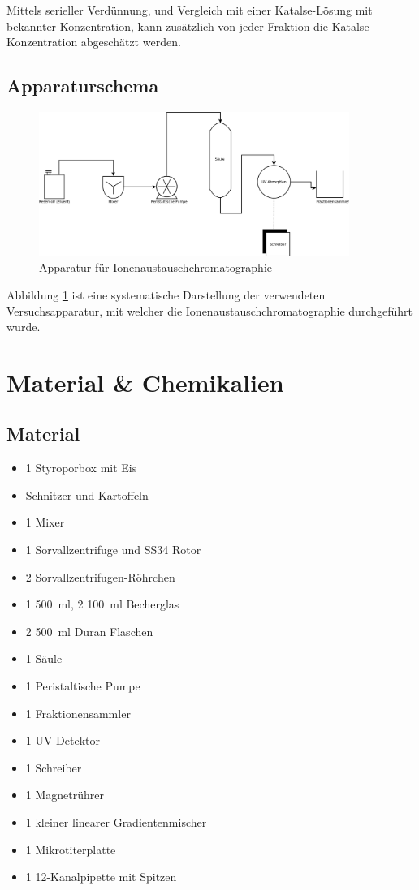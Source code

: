 \documentclass[a4paper,german]{scrreprt}
\begin{document}
Mittels serieller Verdünnung, und Vergleich mit einer Katalse-Lösung mit
bekannter Konzentration, kann zusätzlich von jeder Fraktion die
Katalse-Konzentration abgeschätzt werden.


\section{Apparaturschema}

\begin{figure}[h]
	\centering
	\includegraphics[width=0.9\textwidth]{img/apparatur.png}
	\caption{Apparatur für Ionenaustauschchromatographie}
	\label{fig:apparatur}
\end{figure}

Abbildung \ref{fig:apparatur} ist eine systematische Darstellung der
verwendeten Versuchsapparatur, mit welcher die Ionenaustauschchromatographie
durchgeführt wurde.

\chapter{Material \& Chemikalien}

\section{Material}

\begin{itemize}
	\item 1 Styroporbox mit Eis
	\item Schnitzer und Kartoffeln
	\item 1 Mixer
	\item 1 Sorvallzentrifuge und SS34 Rotor
	\item 2 Sorvallzentrifugen-Röhrchen
	\item 1 \SI{500}{ml}, 2 \SI{100}{ml} Becherglas
	\item 2 \SI{500}{ml} Duran Flaschen
	\item 1 Säule
	\item 1 Peristaltische Pumpe
	\item 1 Fraktionensammler
	\item 1 UV-Detektor
	\item 1 Schreiber
	\item 1 Magnetrührer
	\item 1 kleiner linearer Gradientenmischer
	\item 1 Mikrotiterplatte
	\item 1 12-Kanalpipette mit Spitzen
\end{itemize}
\end{document}
